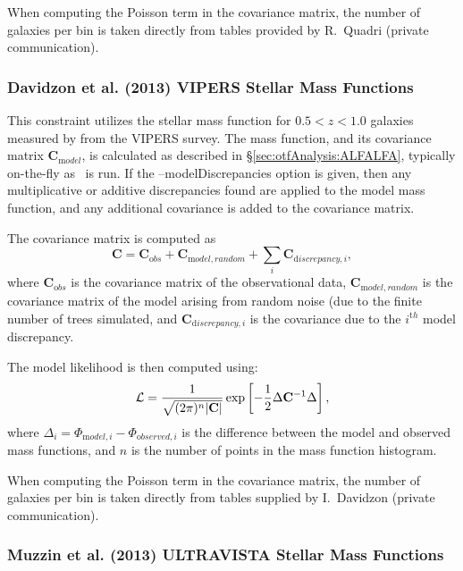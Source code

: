 When computing the Poisson term in the covariance matrix, the number of galaxies per bin is taken directly from tables provided by R.~Quadri (private communication).

\subsubsection{Davidzon et al. (2013) VIPERS Stellar Mass Functions}\label{sec:AnalysisDavidzonVIPERSStellarMassFunction}

This constraint utilizes the stellar mass function for $0.5 < z< 1.0$ galaxies measured by \cite{davidzon_vimos_2013} from the VIPERS survey. The mass function, and its covariance matrix ${\mathbf C}_{\mathrm model}$, is calculated as described in \S\ref{sec:otfAnalysis:ALFALFA}, typically on-the-fly as \glc\ is run. If the {\normalfont \ttfamily --modelDiscrepancies} option is given, then any multiplicative or additive discrepancies found are applied to the model mass function, and any additional covariance is added to the covariance matrix.

The covariance matrix is computed as
\begin{equation}
 {\mathbf C} = {\mathbf C}_{\mathrm obs} + {\mathbf C}_{\mathrm model,random} + \sum_i {\mathbf C}_{{\mathrm discrepancy}, i},
\end{equation}
where ${\mathbf C}_{\mathrm obs}$ is the covariance matrix of the observational data, ${\mathbf C}_{\mathrm model,random}$ is the covariance matrix of the model arising from random noise (due to the finite number of trees simulated, and ${\mathbf C}_{{\mathrm discrepancy}, i}$ is the covariance due to the $i^{\mathrm th}$ model discrepancy.

The model likelihood is then computed using:
\begin{equation}
 \mathcal{L} = {1 \over \sqrt{(2 \pi)^n |{\mathbf C}|}} \exp\left[ -{1\over 2} \Delta {\mathbf C}^{-1} \Delta \right],
\end{equation}
where $\Delta_i = \Phi_{{\mathrm model}, i} - \Phi_{{\mathrm observed}, i}$ is the difference between the model and observed mass functions, and $n$ is the number of points in the mass function histogram.

When computing the Poisson term in the covariance matrix, the number of galaxies per bin is taken directly from tables supplied by I.~Davidzon (private communication).

\subsubsection{Muzzin et al. (2013) ULTRAVISTA Stellar Mass Functions}\label{sec:AnalysisMuzzinULTRAVISTAStellarMassFunction}

